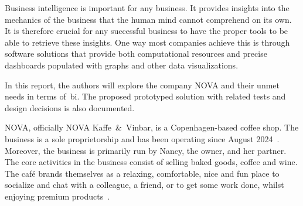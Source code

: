 Business intelligence is important for any business.
It provides insights into the mechanics of the business that the human mind cannot comprehend on its own.
It is therefore crucial for any successful business to have the proper tools to be able to retrieve these insights.
One way most companies achieve this is through software solutions that provide both computational resources and
precise dashboards populated with graphs and other data visualizations.

In this report, the authors will explore the company NOVA and their unmet needs in terms of~\acrfull{bi}.
The proposed prototyped solution with related tests and design decisions is also documented.

NOVA, officially NOVA Kaffe~\&~Vinbar, is a Copenhagen-based coffee shop.
The business is a sole proprietorship and has been operating since August 2024~\cite{cvr2024}.
Moreover, the business is primarily run by Nancy, the owner, and her partner.
The core activities in the business consist of selling baked goods, coffee and wine.
The café brands themselves as a relaxing, comfortable, nice and fun place to socialize and chat with a colleague,
a friend, or to get some work done, whilst enjoying premium products~\cite{instagram2024}.
